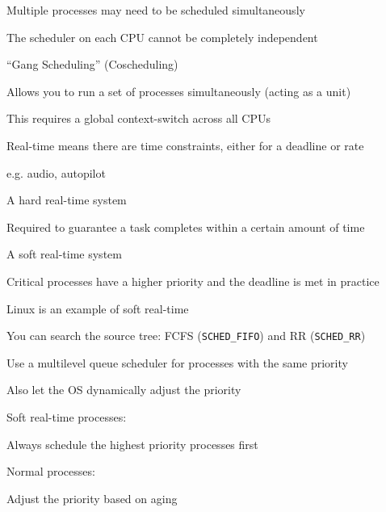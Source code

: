   \begin{slide}


    Multiple processes may need to be scheduled simultaneously
    \medskip

    The scheduler on each CPU cannot be completely independent
    \medskip

    ``Gang Scheduling'' (Coscheduling)

    \leftspace{}Allows you to run a set of processes simultaneously (acting as a unit)
    \medskip

    This requires a global context-switch across all CPUs

  \end{slide}

  \begin{slide}


    Real-time means there are time constraints, either for a deadline or rate

    \leftspace{}e.g. audio, autopilot
    \medskip

    A hard real-time system

    \leftspace{}Required to guarantee a task completes within a certain amount
    of time
    \medskip

    A soft real-time system

    \leftspace{}Critical processes have a higher priority and the deadline is
    met in practice
    \medskip

    Linux is an example of soft real-time

  \end{slide}

  \begin{slide}


    You can search the source tree: FCFS (\texttt{SCHED\_FIFO}) and RR (\texttt{SCHED\_RR})
    \medskip

    Use a multilevel queue scheduler for processes with the same priority

    \leftspace{}Also let the OS dynamically adjust the priority
    \medskip

    Soft real-time processes:

    \leftspace{}Always schedule the highest priority processes first
    \medskip

    Normal processes:

    \leftspace{}Adjust the priority based on aging

  \end{slide}

